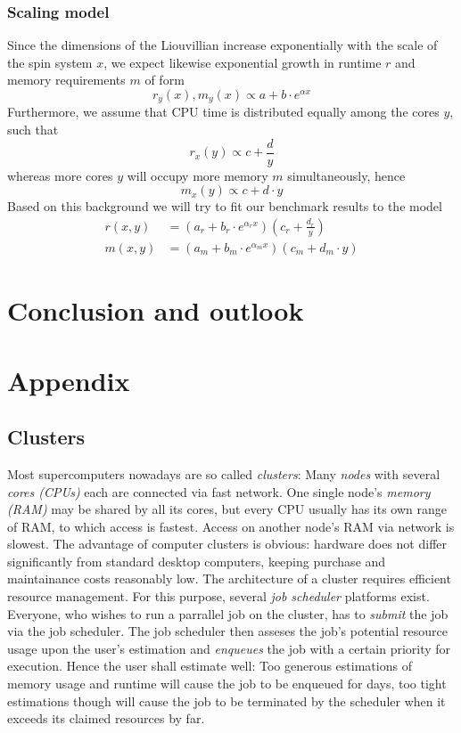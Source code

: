 \documentclass[11.5pt,a4paper]{article}
\begin{document}
\subsubsection{Scaling model}
Since the dimensions of the Liouvillian increase exponentially with the scale of the spin system $x$, we expect likewise exponential growth in runtime $r$ and memory requirements $m$ of form
\begin{equation}
 r_y(x), m_y(x) \propto a + b \cdot e^{\alpha x}
\end{equation}
Furthermore, we assume that CPU time is distributed equally among the cores $y$, such that
\begin{equation}
 r_x(y) \propto c + \frac{d}{y}
\end{equation}
whereas more cores $y$ will occupy more memory $m$ simultaneously, hence
\begin{equation}
 m_x(y) \propto c + d \cdot y
\end{equation}
Based on this background we will try to fit our benchmark results to the model
\begin{align}
 r(x,y)  & = \left( a_r + b_r \cdot e^{\alpha_r x} \right) \left(c_r + \frac{d_r}{y} \right) \\
 m(x,y)  & = \left( a_m + b_m \cdot e^{\alpha_m x} \right) \left(c_m + d_m \cdot y\right)
\end{align}




\section{Conclusion and outlook}

\section{Appendix}

\subsection{Clusters}
\label{sec-clusters}
Most supercomputers nowadays are so called \emph{clusters}: Many \emph{nodes} with several \emph{cores (CPUs)} each are connected via fast network. One single node's \emph{memory (RAM)} may be shared by all its cores, but every CPU usually has its own range of RAM, to which access is fastest. Access on another node's RAM via network is slowest. The advantage of computer clusters is obvious: hardware does not differ significantly from standard desktop computers, keeping purchase and maintainance costs reasonably low. 
The architecture of a cluster requires efficient resource management. For this purpose, several \emph{job scheduler} platforms exist. Everyone, who wishes to run a parrallel job on the cluster, has to \emph{submit} the job via the job scheduler. The job scheduler then asseses the job's potential resource usage upon the user's estimation and \emph{enqueues} the job with a certain priority for execution. Hence the user shall estimate well: Too generous estimations of memory usage and runtime will cause the job to be enqueued for days, too tight estimations though will cause the job to be terminated by the scheduler when it exceeds its claimed resources by far. 
\end{document}
